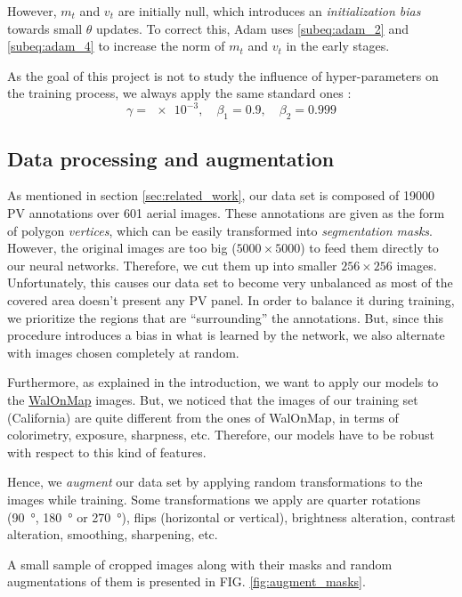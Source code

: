 \documentclass[twocolumn,superscriptaddress,aps,nofootinbib]{revtex4-1}
\begin{document}
However, $m_{t}$ and $v_{t}$ are initially null, which introduces an \emph{initialization bias} towards small $\theta$ updates. To correct this, Adam uses \ref{subeq:adam_2} and \ref{subeq:adam_4} to increase the norm of $m_t$ and $v_t$ in the early stages.

As the goal of this project is not to study the influence of hyper-parameters on the training process, we always apply the same standard ones :
\begin{equation*}
    \gamma = \num{e-3}, \quad \beta_1 = \num{0.9}, \quad \beta_2 = \num{0.999}
\end{equation*}

\subsection{Data processing and augmentation} \label{subsec:augmentation}

As mentioned in section \ref{sec:related_work}, our data set is composed of \num{19000} PV annotations over \num{601} aerial images. These annotations are given as the form of polygon \emph{vertices}, which can be easily transformed into \emph{segmentation masks}. However, the original images are too big ($5000 \times 5000$) to feed them directly to our neural networks. Therefore, we cut them up into smaller $256 \times 256$ images. Unfortunately, this causes our data set to become very unbalanced as most of the covered area doesn't present any PV panel. In order to balance it during training, we prioritize the regions that are \enquote{surrounding} the annotations. But, since this procedure introduces a bias in what is learned by the network, we also alternate with images chosen completely at random.

Furthermore, as explained in the introduction, we want to apply our models to the \href{https://geoportail.wallonie.be/walonmap}{WalOnMap} images. But, we noticed that the images of our training set (California) are quite different from the ones of WalOnMap, in terms of colorimetry, exposure, sharpness, etc. Therefore, our models have to be robust with respect to this kind of features.

Hence, we \emph{augment} our data set by applying random transformations to the images while training. Some transformations we apply are quarter rotations (\SI{90}{\degree}, \SI{180}{\degree} or \SI{270}{\degree}), flips (horizontal or vertical), brightness alteration, contrast alteration, smoothing, sharpening, etc.

A small sample of cropped images along with their masks and random augmentations of them is presented in FIG. \ref{fig:augment_masks}.
\end{document}
